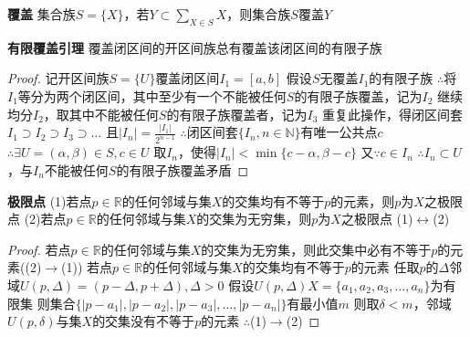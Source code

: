 \documentclass[11pt]{article}
\begin{document}
\textbf{覆盖} \newline
集合族$S=\{X\}$，若$Y\subset\sum\limits_{X\in S}X$，则集合族$S$覆盖$Y$ \newline

\textbf{有限覆盖引理} \newline
覆盖闭区间的开区间族总有覆盖该闭区间的有限子族 \newline
\begin{proof}
  记开区间族$S=\{U\}$覆盖闭区间$I_1=[a,b]$ \newline
  假设$S$无覆盖$I_1$的有限子族 \newline
  $\therefore$将$I_1$等分为两个闭区间，其中至少有一个不能被任何$S$的有限子族覆盖，记为$I_2$ \newline
  继续均分$I_2$，取其中不能被任何$S$的有限子族覆盖者，记为$I_3$ \newline
  重复此操作，得闭区间套$I_1\supset I_2\supset I_3\supset\dots$ \newline
  且$|I_n|=\frac{|I_1|}{2^{n-1}}$ \newline
  $\therefore$闭区间套$\{I_n,n\in\mathbb{N}\}$有唯一公共点$c$ \newline
  $\therefore \exists U=(\alpha,\beta)\in S, c\in U$ \newline
  取$I_n$，使得$|I_n|<\min\{c-\alpha,\beta-c\}$ \newline
  又$\because c\in I_n$ \newline
  $\therefore$$I_n\subset U$，与$I_n$不能被任何$S$的有限子族覆盖矛盾
\end{proof}

\textbf{极限点} \newline
(1)若点$p\in\mathbb{R}$的任何邻域与集$X$的交集均有不等于$p$的元素，则$p$为$X$之极限点 \newline
(2)若点$p\in\mathbb{R}$的任何邻域与集$X$的交集为无穷集，则$p$为$X$之极限点 \newline
(1)$\longleftrightarrow$(2) \newline
\begin{proof}
  若点$p\in\mathbb{R}$的任何邻域与集$X$的交集为无穷集，则此交集中必有不等于$p$的元素((2)$\rightarrow$(1)) \newline
  若点$p\in\mathbb{R}$的任何邻域与集$X$的交集均有不等于$p$的元素 \newline
  任取$p$的$\Delta$邻域$U(p,\Delta)=(p-\Delta,p+\Delta), \Delta>0$ \newline
  假设$U(p,\Delta)X=\{a_1,a_2,a_3,\dots,a_n\}$为有限集 \newline
  则集合$\{|p-a_1|,|p-a_2|,|p-a_3|,\dots,|p-a_n|\}$有最小值$m$ \newline
  则取$\delta<m$，邻域$U(p,\delta)$与集$X$的交集没有不等于$p$的元素 \newline
  $\therefore$(1)$\rightarrow$(2)
\end{proof}
\end{document}
